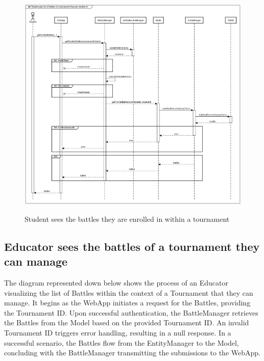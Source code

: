 \documentclass{Configuration_Files/Template}
\begin{document}
\begin{figure}[H]
\centering
\includegraphics[scale = 0.33]{Images/diagrams/sequences/GetEnrolledBattles.png}\\
\caption{Student sees the battles they are enrolled in within a tournament}
\end{figure}

\subsection*{Educator sees the battles of a tournament they can manage}

The diagram represented down below shows the process of an Educator visualizing the list of Battles within the context of a Tournament that they can manage. It begins as the WebApp initiates a request for the Battles, providing the Tournament ID. Upon successful authentication, the BattleManager retrieves the Battles from the Model based on the provided Tournament ID. An invalid Tournament ID triggers error handling, resulting in a null response. In a successful scenario, the Battles flow from the EntityManager to the Model, concluding with the BattleManager transmitting the submissions to the WebApp.
\end{document}
